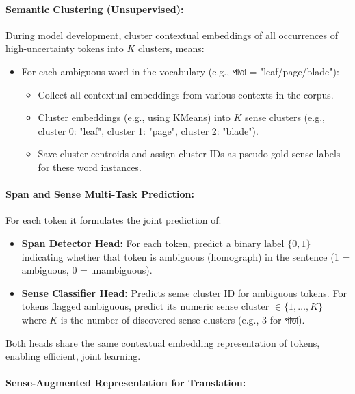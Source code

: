 \documentclass[a4paper,12pt]{article}
\begin{document}
\paragraph{Semantic Clustering (Unsupervised):} During model development, cluster contextual embeddings of all occurrences of high-uncertainty tokens into $K$ clusters, means:

\begin{itemize}
    \item For each ambiguous word in the vocabulary (e.g., \textbengali{পাতা} = "leaf/page/blade"):
    \begin{itemize}
        \item Collect all contextual embeddings from various contexts in the corpus.
        \item Cluster embeddings (e.g., using KMeans) into $K$ sense clusters (e.g., cluster 0: "leaf", cluster 1: "page", cluster 2: "blade").
        \item Save cluster centroids and assign cluster IDs as pseudo-gold sense labels for these word instances.
    \end{itemize}
\end{itemize}

\paragraph{Span and Sense Multi-Task Prediction:}

For each token it formulates the joint prediction of:

\begin{itemize}
    \item \textbf{Span Detector Head:} For each token, predict a binary label $\{0,1\}$ indicating whether that token is ambiguous (homograph) in the sentence (1 = ambiguous, 0 = unambiguous).
    \item \textbf{Sense Classifier Head:} Predicts sense cluster ID for ambiguous tokens. For tokens flagged ambiguous, predict its numeric sense cluster $\in\{1,\ldots,K\}$ where $K$ is the number of discovered sense clusters (e.g., 3 for \textbengali{পাতা}).
\end{itemize}

Both heads share the same contextual embedding representation of tokens, enabling efficient, joint learning.

\paragraph{Sense-Augmented Representation for Translation:}
\end{document}
